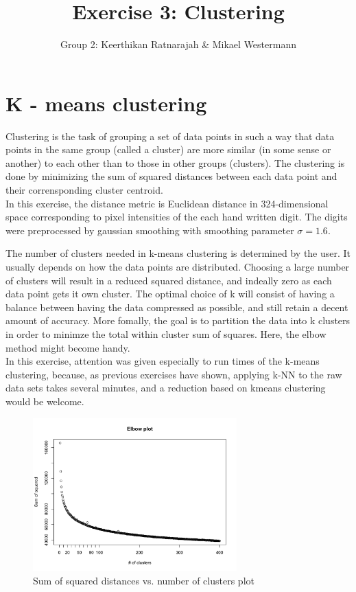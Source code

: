 \documentclass[10pt,a4paper]{article}
\title{Exercise 3: Clustering}
\author{Group 2: Keerthikan Ratnarajah \& Mikael Westermann}
\begin{document}
\maketitle
\section{K - means clustering}
Clustering is the task of grouping a set of data points in such
a way that data points in the same group (called a cluster)
are more similar (in some sense or another) to each other
than to those in other groups (clusters).
The clustering is done by minimizing  the sum of squared distances
between each data point and their corrensponding cluster centroid. \\

In this exercise, the distance metric is Euclidean distance
in 324-dimensional space corresponding to pixel intensities of
the each hand written digit.
The digits were preprocessed by gaussian smoothing with smoothing parameter
\(\sigma=1.6\).

The number of clusters needed in k-means clustering is determined by the user.
It usually depends on how the data points are distributed.
Choosing a large number of clusters will result in a reduced
squared distance, and indeally zero as each data point gets it own cluster.
The optimal choice of k will consist of having a balance between having the
data compressed as possible, and still retain a decent amount of accuracy.
More fomally, the goal is to partition the data into k clusters in order to minimze the total
within cluster sum of squares. Here, the elbow method might become handy. \\

In this exercise, attention was given especially to run times of
the k-means clustering, because, as previous exercises have shown,
applying k-NN to the raw data sets
takes several minutes, and a reduction based on kmeans clustering
would be welcome.

\begin{figure}[H]
\centering
\includegraphics[width = 0.7\textwidth]{compl_elbow.png}
\caption{Sum of squared distances vs. number of clusters plot}
\label{fig:elbow}
\end{figure}
\end{document}
